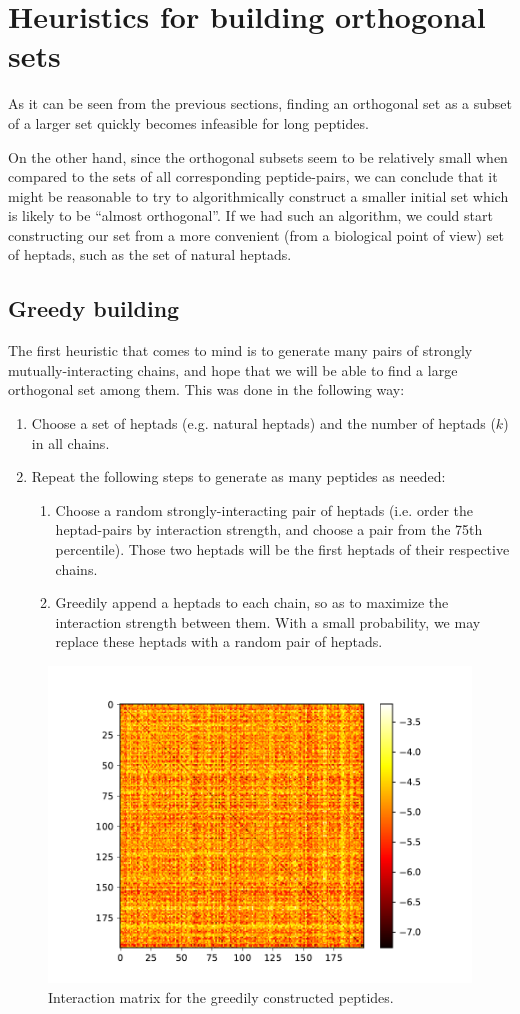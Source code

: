 \documentclass[12pt,a4paper,titlepage,openany]{report}
\begin{document}
\section{Heuristics for building orthogonal sets}
\label{sec:heuristics}
As it can be seen from the previous sections, finding an orthogonal set as a subset of a larger set quickly becomes infeasible for long peptides. 

On the other hand, since the orthogonal subsets seem to be relatively small when compared to the sets of all corresponding peptide-pairs, we can conclude that it might be reasonable to try to algorithmically construct a smaller initial set which is likely to be ``almost orthogonal''. If we had such an algorithm, we could start constructing our set from a more convenient (from a biological point of view) set of heptads, such as the set of natural heptads.

\subsection{Greedy building}
The first heuristic that comes to mind is to generate many pairs of strongly mutually-interacting chains, and hope that we will be able to find a large orthogonal set among them. This was done in the following way:
\begin{enumerate}
	\item Choose a set of heptads (e.g. natural heptads) and the number of heptads ($k$) in all chains.
	\item Repeat the following steps to generate as many peptides as needed:
	\begin{enumerate}
		\item Choose a random strongly-interacting pair of heptads (i.e. order the heptad-pairs by interaction strength, and choose a pair from the 75th percentile). Those two heptads will be the first heptads of their respective chains.
		\item Greedily append a heptads to each chain, so as to maximize the interaction strength between them. With a small probability, we may replace these heptads with a random pair of heptads.
	\end{enumerate}
\end{enumerate}

\begin{figure}[h]
	\centering
	\includegraphics[width=0.7\linewidth]{interaction_matrix_greedy.pdf}
	\caption{Interaction matrix for the greedily constructed peptides.}
	\label{fig:interaction matrix-greedy}
\end{figure}
\end{document}

